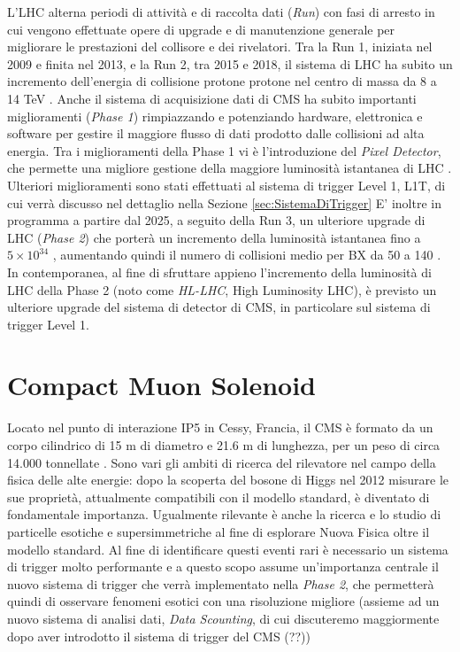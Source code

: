 L'LHC alterna periodi di attività e di raccolta dati (\textit{Run}) con fasi di arresto in cui vengono effettuate opere di upgrade e di manutenzione generale per migliorare le prestazioni del collisore e dei rivelatori. Tra la Run 1, iniziata nel 2009 e finita nel 2013, e la Run 2, tra 2015 e 2018, il sistema di LHC ha subito un incremento dell'energia di collisione protone protone nel centro di massa da 8 a 14 TeV \cite{sirunyan2020performance}. Anche il sistema di acquisizione dati di CMS ha subito importanti miglioramenti (\textit{Phase 1}) rimpiazzando e potenziando hardware, elettronica e software per gestire il maggiore flusso di dati prodotto dalle collisioni ad alta energia. Tra i miglioramenti della Phase 1 vi è l'introduzione del \textit{Pixel Detector}, che permette una migliore gestione della maggiore luminosità istantanea di LHC \cite{Adam:2748381}. Ulteriori miglioramenti sono stati effettuati al sistema di trigger Level 1, L1T, di cui verrà discusso nel dettaglio nella Sezione \ref{sec:SistemaDiTrigger} \newline 
E' inoltre in programma a partire dal 2025, a seguito della Run 3, un ulteriore upgrade di LHC (\textit{Phase 2}) che porterà un incremento della luminosità istantanea fino a $5\times 10^{34}$ \Lumi, aumentando quindi il numero di collisioni medio per BX da 50 a 140 \cite{collaboration2021phase}. In contemporanea, al fine di sfruttare appieno l'incremento della luminosità di LHC della Phase 2 (noto come \textit{HL-LHC}, High Luminosity LHC), è previsto un ulteriore upgrade del sistema di detector di CMS, in particolare sul sistema di trigger Level 1.


\section{Compact Muon Solenoid}  
\label{sec:CMSDescrizione}

Locato nel punto di interazione IP5 in Cessy, Francia, il CMS è formato da un corpo cilindrico di 15 m di diametro e 21.6 m di lunghezza, per un peso di circa 14.000 tonnellate \cite{cms2008cms}. Sono vari gli ambiti di ricerca del rilevatore nel campo della fisica delle alte energie: dopo la scoperta del bosone di Higgs nel 2012 misurare le sue proprietà, attualmente compatibili con il modello standard, è diventato di fondamentale importanza. Ugualmente rilevante è anche la ricerca e lo studio di particelle esotiche e supersimmetriche al fine di esplorare Nuova Fisica oltre il modello standard. Al fine di identificare questi eventi rari è necessario un sistema di trigger molto performante \cite{sirunyan2020performance} e a questo scopo assume un'importanza centrale il nuovo sistema di trigger che verrà implementato nella \textit{Phase 2}, che permetterà quindi di osservare fenomeni esotici con una risoluzione migliore (assieme ad un nuovo sistema di analisi dati, \textit{Data Scounting}, di cui discuteremo maggiormente dopo aver introdotto il sistema di trigger del CMS (??))


